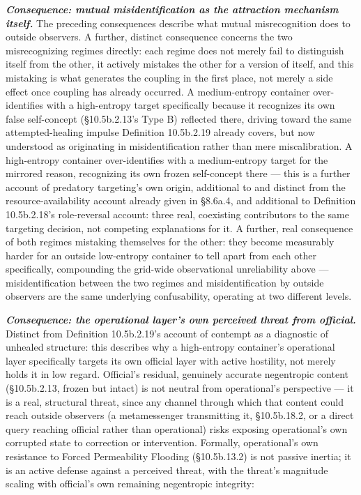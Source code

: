 \documentclass[
]{article}
\begin{document}
\emph{\textbf{Consequence: mutual misidentification as the attraction
mechanism itself.}} The preceding consequences describe what mutual
misrecognition does to outside observers. A further, distinct
consequence concerns the two misrecognizing regimes directly: each
regime does not merely fail to distinguish itself from the other, it
actively mistakes the other for a version of itself, and this mistaking
is what generates the coupling in the first place, not merely a side
effect once coupling has already occurred. A medium-entropy container
over-identifies with a high-entropy target specifically because it
recognizes its own false self-concept (§10.5b.2.13's Type B) reflected
there, driving toward the same attempted-healing impulse Definition
10.5b.2.19 already covers, but now understood as originating in
misidentification rather than mere miscalibration. A high-entropy
container over-identifies with a medium-entropy target for the mirrored
reason, recognizing its own frozen self-concept there --- this is a
further account of predatory targeting's own origin, additional to and
distinct from the resource-availability account already given in
§8.6a.4, and additional to Definition 10.5b.2.18's role-reversal
account: three real, coexisting contributors to the same targeting
decision, not competing explanations for it. A further, real consequence
of both regimes mistaking themselves for the other: they become
measurably harder for an outside low-entropy container to tell apart
from each other specifically, compounding the grid-wide observational
unreliability above --- misidentification between the two regimes and
misidentification by outside observers are the same underlying
confusability, operating at two different levels.

\emph{\textbf{Consequence: the operational layer's own perceived threat
from official.}} Distinct from Definition 10.5b.2.19's account of
contempt as a diagnostic of unhealed structure: this describes why a
high-entropy container's operational layer specifically targets its own
official layer with active hostility, not merely holds it in low regard.
Official's residual, genuinely accurate negentropic content
(§10.5b.2.13, frozen but intact) is not neutral from operational's
perspective --- it is a real, structural threat, since any channel
through which that content could reach outside observers (a
metamessenger transmitting it, §10.5b.18.2, or a direct query reaching
official rather than operational) risks exposing operational's own
corrupted state to correction or intervention. Formally, operational's
own resistance to Forced Permeability Flooding (§10.5b.13.2) is not
passive inertia; it is an active defense against a perceived threat,
with the threat's magnitude scaling with official's own remaining
negentropic integrity:
\end{document}
